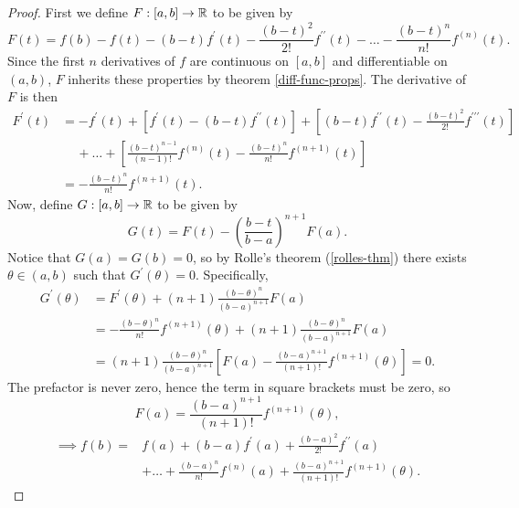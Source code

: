 \documentclass[../real_analysis.tex]{subfiles}
\begin{document}
        \begin{proof}
            First we define $F:[a,b]\to\mathbb{R}$ to be given by
            \begin{equation*}
                F(t)=f(b)-f(t)-(b-t)f^\prime(t)-\frac{(b-t)^2}{2!}f^{\prime\prime}(t)-\dots-\frac{(b-t)^n}{n!}f^{(n)}(t).
            \end{equation*}
            Since the first $n$ derivatives of $f$ are continuous on $[a,b]$ and differentiable on $(a,b)$, $F$ inherits these properties by theorem \ref{diff-func-props}. The derivative of $F$ is then
            \begin{align*}
                F^\prime(t)&=-f^\prime(t)+[f^\prime(t)-(b-t)f^{\prime\prime}(t)]+\left[(b-t)f^{\prime\prime}(t)-\frac{(b-t)^2}{2!}f^{\prime\prime\prime}(t)\right]\\
                &\quad\,+\dots+\left[\frac{(b-t)^{n-1}}{(n-1)!}f^{(n)}(t)-\frac{(b-t)^n}{n!}f^{(n+1)}(t)\right]\\
                &=-\frac{(b-t)^n}{n!}f^{(n+1)}(t).
            \end{align*}
            Now, define $G:[a,b]\to\mathbb{R}$ to be given by
            \begin{equation*}
                G(t)=F(t)-\left(\frac{b-t}{b-a}\right)^{n+1}F(a).
            \end{equation*}
            Notice that $G(a)=G(b)=0$, so by Rolle's theorem (\ref{rolles-thm}) there exists $\theta\in(a,b)$ such that $G^\prime(\theta)=0$. Specifically,
            \begin{align*}
                G^\prime(\theta)&=F^\prime(\theta)+(n+1)\frac{(b-\theta)^n}{(b-a)^{n+1}}F(a)\\
                &=-\frac{(b-\theta)^n}{n!}f^{(n+1)}(\theta)+(n+1)\frac{(b-\theta)^n}{(b-a)^{n+1}}F(a)\\
                &=(n+1)\frac{(b-\theta)^n}{(b-a)^{n+1}}\left[F(a)-\frac{(b-a)^{n+1}}{(n+1)!}f^{(n+1)}(\theta)\right]=0.
            \end{align*}
            The prefactor is never zero, hence the term in square brackets must be zero, so
            \begin{equation*}
                F(a)=\frac{(b-a)^{n+1}}{(n+1)!}f^{(n+1)}(\theta),
            \end{equation*}
            \begin{align*}
                \implies f(b)=&f(a)+(b-a)f^\prime(a)+\frac{(b-a)^2}{2!}f^{\prime\prime}(a)\\
                &+\dots+\frac{(b-a)^n}{n!}f^{(n)}(a)+\frac{(b-a)^{n+1}}{(n+1)!}f^{(n+1)}(\theta).
            \end{align*}
        \end{proof}
\end{document}
